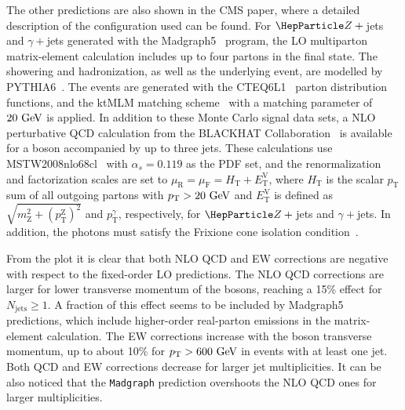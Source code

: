 \documentclass[11pt]{cernrep}
\begin{document}
The other predictions are also shown in the CMS paper, where a
detailed description of the configuration used can be found. For
$\PZ+{}$jets and $\gamma+{}$jets generated with the {\sc
  Madgraph5}~\cite{MadGraph5} program, the LO multiparton
matrix-element calculation includes up to four partons in the final
state. The showering and hadronization, as well as the underlying
event, are modelled by {\sc PYTHIA6}~\cite{pythia6}. The events are
generated with the CTEQ6L1~\cite{CTEQ6} parton distribution functions,
and the ktMLM matching scheme~\cite{MatchingPaper} with a matching
parameter of $20~\text{GeV}$ is applied.  In addition to these Monte Carlo
signal data sets, a NLO perturbative QCD calculation from the {\sc
  BLACKHAT} Collaboration~\cite{BlackHat} is available for a boson
accompanied by up to three jets. These calculations use
MSTW2008nlo68cl~\cite{MSTW} with $\alpha_{s}=0.119$ as the PDF set,
and the renormalization and factorization scales are set to
$\mu_{\mathrm{R}}=\mu_{\mathrm{F}}=H_{\mathrm{T}}+E_{\mathrm{T}}^{\mathrm{V}}$, where
$H_{\mathrm{T}}$ is the scalar $p_{\mathrm{T}}$ sum of all outgoing
partons with $p_{\mathrm{T}}>20~\text{GeV}$ and
$E_{\mathrm{T}}^{\mathrm{V}}$ is defined as
$\sqrt{m_{\mathrm{Z}}^{2}+\left(p_{\mathrm{T}}^{\mathrm{Z}}\right)^{2}}$
and $p_{\mathrm{T}}^{\gamma}$, respectively, for $\PZ+{}$jets and
$\gamma+{}$jets.  In addition, the photons must satisfy the Frixione
cone isolation condition~\cite{Frixione}.

From the plot it is clear that both NLO QCD and EW corrections are
negative with respect to the fixed-order LO predictions. The NLO QCD
corrections are larger for lower transverse momentum of the bosons,
reaching a 15\% effect for $N_{\mathrm{jets}} \geq 1$. A fraction of
this effect seems to be included by {\sc Madgraph5} predictions, which
include higher-order real-parton emissions in the matrix-element
calculation. The EW corrections increase with the boson transverse
momentum, up to about 10\% for $p_{\mathrm{T}} > 600~\text{GeV}$ in events
with at least one jet. Both QCD and EW corrections decrease for
larger jet multiplicities. It can be also noticed that the {\tt Madgraph}
prediction overshoots the NLO QCD ones for larger multiplicities.
\end{document}
